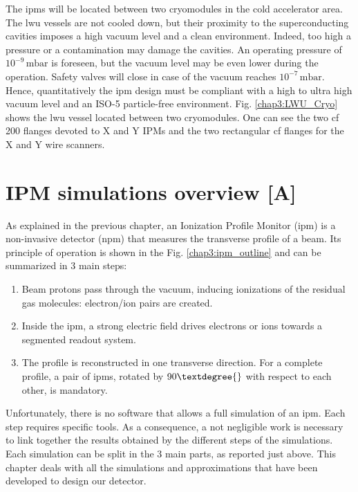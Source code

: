 \begin{refsection}
  The \acrshort{ipm}s will be located between two cryomodules in the cold accelerator area. The \acrshort{lwu} vessels are not cooled down, but their proximity to the superconducting cavities imposes a high vacuum level and a clean environment. Indeed, too high a pressure or a contamination may damage the cavities. An operating pressure of \(10^{-9}\,\mathrm{mbar}\) is foreseen, but the vacuum level may be even lower during the operation. Safety valves will close in case of the vacuum reaches \(10^{-7}\,\mathrm{mbar}\). Hence, quantitatively the \acrshort{ipm} design must be compliant with a high to ultra high vacuum level and an ISO-5 \cite{ISO14644} particle-free environment. Fig. \ref{chap3:LWU_Cryo} shows the \acrshort{lwu} vessel located between two cryomodules. One can see the two \acrshort{cf} 200 flanges devoted to X and Y IPMs and the two rectangular \acrshort{cf} flanges for the X and Y wire scanners.

  \section{IPM simulations overview [A]}

  

  As explained in the previous chapter, an Ionization Profile Monitor (\acrshort{ipm}) is a non-invasive detector (\acrshort{npm}) that measures the transverse profile of a beam.
  Its principle of operation is shown in the Fig. \ref{chap3:ipm_outline} and can be summarized in 3 main steps:
  \begin{enumerate}
    \item Beam protons pass through the vacuum, inducing ionizations of the residual gas molecules: electron/ion pairs are created.
    \item Inside the \acrshort{ipm}, a strong electric field drives electrons or ions towards a segmented readout system.
    \item The profile is reconstructed in one transverse direction. For a complete profile, a pair of \acrshort{ipm}s, rotated by $90\textdegree{}$ with respect to each other, is mandatory.
  \end{enumerate}

  Unfortunately, there is no software that allows a full simulation of an \acrshort{ipm}. Each step requires specific tools. As a consequence, a not negligible work is necessary to link together the results obtained by the different steps of the simulations. Each simulation can be split in the 3 main parts, as reported just above. This chapter deals with all the simulations and approximations that have been developed to design our detector.


\end{refsection}
